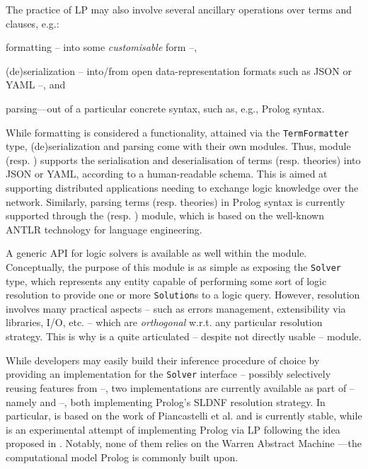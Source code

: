 \documentclass[12pt,a4paper,openright,twoside]{book}
\begin{document}
The practice of LP may also involve several ancillary operations over terms and clauses, e.g.:
%
\begin{inlinelist}
    \item formatting -- into some \emph{customisable} form --,
    \item (de)serialization -- into/from open data-representation formats such as JSON or YAML --, and
    \item parsing---out of a particular concrete syntax, such as, e.g., Prolog syntax.
\end{inlinelist}
%
While formatting is considered a  functionality, attained via the \texttt{TermFormatter} type, (de)serialization and parsing come with their own modules.
%
Thus, module  (resp. ) supports the serialisation and deserialisation of terms (resp. theories) into JSON or YAML, according to a human-readable schema.
%
This is aimed at supporting distributed applications needing to exchange logic knowledge over the network.
%
Similarly, parsing terms (resp. theories) in Prolog syntax is currently supported through the  (resp. ) module, which is based on the well-known ANTLR technology \cite{Parr2013} for language engineering.

A generic API for logic solvers is available as well within the  module.
%
Conceptually, the purpose of this module is as simple as exposing the \texttt{Solver} type, which represents any entity capable of performing some sort of logic resolution to provide one or more \texttt{Solution}s to a logic query.
%
However, resolution involves many practical aspects -- such as errors management, extensibility via libraries, I/O, etc. -- which are \emph{orthogonal} w.r.t. any particular resolution strategy.
%
This is why  is a quite articulated -- despite not directly usable -- module.

While developers may easily build their inference procedure of choice by providing an implementation for the \texttt{Solver} interface -- possibly selectively reusing features from  --, two implementations are currently available as part of \twopkt{} -- namely  and  --, both implementing Prolog's SLDNF resolution strategy.
%
In particular,  is based on the work of Piancastelli et al. \cite{tuprolog-sac08} and is currently stable, while  is an experimental attempt of implementing Prolog via LP following the idea proposed in \cite{Carlsson84}.
%
Notably, none of them relies on the Warren Abstract Machine \cite{Warren1983}---the computational model Prolog is commonly built upon.
\end{document}
